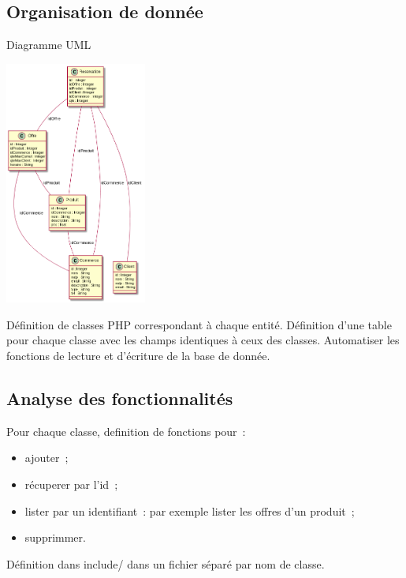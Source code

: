 \documentclass{beamer}
\begin{document}
\subsection{Organisation de donnée}

\begin{frame}{Diagramme UML}
	\begin{center}
		\includegraphics[height=8cm]{uml.png}
	\end{center}
\end{frame}

\begin{frame}
	Définition de classes PHP correspondant à chaque entité.
	\bigbreak
	Définition d'une table pour chaque classe avec les champs identiques à ceux des classes.
	\bigbreak
	Automatiser les fonctions de lecture et d'écriture de la base de donnée.
\end{frame}

\subsection{Analyse des fonctionnalités}

\begin{frame}
	Pour chaque classe, definition de fonctions pour~:
	\begin{itemize}
		\item ajouter~;
		\item récuperer par l'id~;
		\item lister par un identifiant~: par exemple lister les offres d'un produit~;
		\item supprimmer.
	\end{itemize}

	Définition dans include/ dans un fichier séparé par nom de classe.

\end{frame}
\end{document}
